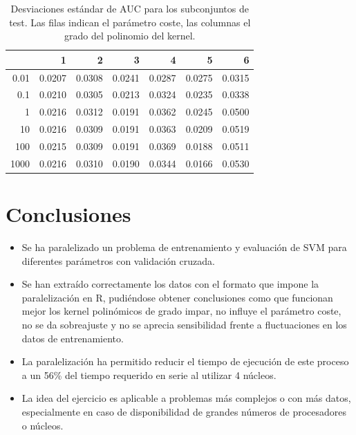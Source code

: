 \documentclass[12pt]{scrartcl}
\begin{document}
\begin{table}[ht]
\centering
\begin{tabular}{rrrrrrr}
  \hline
 & 1 & 2 & 3 & 4 & 5 & 6 \\ 
  \hline
0.01 & 0.0207 & 0.0308 & 0.0241 & 0.0287 & 0.0275 & 0.0315 \\ 
  0.1 & 0.0210 & 0.0305 & 0.0213 & 0.0324 & 0.0235 & 0.0338 \\ 
  1 & 0.0216 & 0.0312 & 0.0191 & 0.0362 & 0.0245 & 0.0500 \\ 
  10 & 0.0216 & 0.0309 & 0.0191 & 0.0363 & 0.0209 & 0.0519 \\ 
  100 & 0.0215 & 0.0309 & 0.0191 & 0.0369 & 0.0188 & 0.0511 \\ 
  1000 & 0.0216 & 0.0310 & 0.0190 & 0.0344 & 0.0166 & 0.0530 \\ 
   \hline
\end{tabular}
\caption{Desviaciones estándar de AUC para los subconjuntos de test. Las filas indican el parámetro coste, las columnas el grado del polinomio del kernel.} 
\label{table:sdtest}
\end{table}\clearpage
\section{Conclusiones}
\begin{itemize}
\item Se ha paralelizado un problema de entrenamiento y evaluación de SVM para diferentes parámetros con validación cruzada.
\item Se han extraído correctamente los datos con el formato que impone la paralelización en R, pudiéndose obtener conclusiones como que funcionan mejor los kernel polinómicos de grado impar, no influye el parámetro coste, no se da sobreajuste y no se aprecia sensibilidad frente a fluctuaciones en los datos de entrenamiento.
\item La paralelización ha permitido reducir el tiempo de ejecución de este proceso a un 56\% del tiempo requerido en serie al utilizar 4 núcleos.
\item La idea del ejercicio es aplicable a problemas más complejos o con más datos, especialmente en caso de disponibilidad de grandes números de procesadores o núcleos.
\end{itemize}




\end{document}
